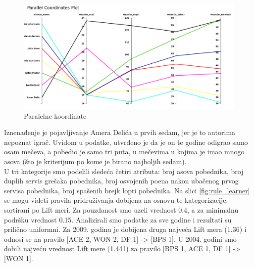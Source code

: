 \documentclass[a4paper]{article}
\begin{document}
\begin{figure}[H]
	\begin{center}
		\includegraphics[scale=0.30]{KNIME_project/PravilaPridruzivanja/parallel2009}
	\end{center}
	\caption{Paralelne koordinate}
	\label{fig:parallel}
\end{figure}

Iznenađenje je pojavljivanje Amera Delića u prvih sedam, jer je to
autorima nepoznat igrač. Uvidom u podatke, utvrđeno je da je on te godine odigrao samo osam mečeva,
a pobedio je samo tri puta, u mečevima u kojima je imao mnogo asova (što je kriterijum po kome je birano najboljih sedam). \\

U tri kategorije smo podelili sledeća četiri atributa: broj asova pobednika, broj duplih servis grešaka pobednika,
broj osvojenih poena nakon ubačenog prvog servisa pobednika, broj spašenih brejk lopti pobednika.
Na slici \ref{fig:rule_learner} se mogu videti pravila pridruživanja dobijena na osnovu te kategorizacije,
sortirani po Lift meri. Za pouzdanost smo uzeli vrednost 0.4, a za minimalnu podršku vrednost 0.15.
Analizirali smo podatke za sve godine i rezultati su prilično uniformni. Za 2009. godinu je dobijena druga najveća
Lift mera (1.36) i odnosi se na pravilo [ACE 2, WON 2, DF 1] -> [BPS 1].
U 2004. godini smo dobili najveću vrednost Lift mere (1.441) za pravilo [BPS 1, ACE 1, DF 1] -> [WON 1].
\end{document}
